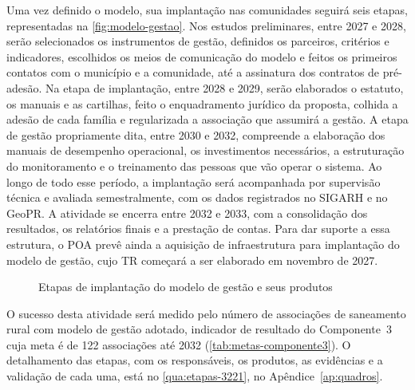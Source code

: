Uma vez definido o modelo, sua implantação nas comunidades seguirá seis
etapas, representadas na \autoref{fig:modelo-gestao}. Nos estudos
preliminares, entre 2027 e 2028, serão selecionados os instrumentos de
gestão, definidos os parceiros, critérios e indicadores, escolhidos os meios
de comunicação do modelo e feitos os primeiros contatos com o município e a
comunidade, até a assinatura dos contratos de pré-adesão. Na etapa de
implantação, entre 2028 e 2029, serão elaborados o estatuto, os manuais e as
cartilhas, feito o enquadramento jurídico da proposta, colhida a adesão de
cada família e regularizada a associação que assumirá a gestão. A etapa de
gestão propriamente dita, entre 2030 e 2032, compreende a elaboração dos
manuais de desempenho operacional, os investimentos necessários, a
estruturação do monitoramento e o treinamento das pessoas que vão operar o
sistema. Ao longo de todo esse período, a implantação será acompanhada por
supervisão técnica e avaliada semestralmente, com os dados registrados no
SIGARH e no GeoPR. A atividade se encerra entre 2032 e 2033, com a
consolidação dos resultados, os relatórios finais e a prestação de contas.
Para dar suporte a essa estrutura, o POA prevê ainda a aquisição de
infraestrutura para implantação do modelo de gestão, cujo TR começará a ser
elaborado em novembro de 2027.

\begin{figure}[htbp]
  \centering
  \caption{Etapas de implantação do modelo de gestão e seus produtos}
  \label{fig:modelo-gestao}
\end{figure}

O sucesso desta atividade será medido pelo número de associações de
saneamento rural com modelo de gestão adotado, indicador de resultado do
Componente~3 cuja meta é de 122 associações até 2032
(\autoref{tab:metas-componente3}). O detalhamento das etapas, com os
responsáveis, os produtos, as evidências e a validação de cada uma, está no
\autoref{qua:etapas-3221}, no Apêndice~\ref{ap:quadros}.


